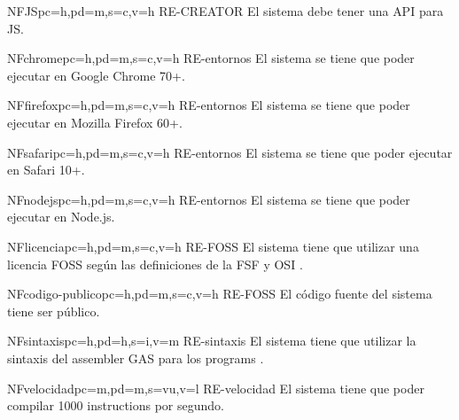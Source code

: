 \begin{softwareReq}{NF}{JS}{pc=h,pd=m,s=c,v=h}
    {RE-CREATOR}
    El sistema debe tener una \gls{API} para \gls{JS}.
\end{softwareReq}

\begin{softwareReq}{NF}{chrome}{pc=h,pd=m,s=c,v=h}
    {RE-entornos}
    El sistema se tiene que poder ejecutar en Google Chrome 70+.
\end{softwareReq}

\begin{softwareReq}{NF}{firefox}{pc=h,pd=m,s=c,v=h}
    {RE-entornos}
    El sistema se tiene que poder ejecutar en Mozilla Firefox 60+.
\end{softwareReq}

\begin{softwareReq}{NF}{safari}{pc=h,pd=m,s=c,v=h}
    {RE-entornos}
    El sistema se tiene que poder ejecutar en Safari 10+.
\end{softwareReq}

\begin{softwareReq}{NF}{nodejs}{pc=h,pd=m,s=c,v=h}
    {RE-entornos}
    El sistema se tiene que poder ejecutar en Node.js.
\end{softwareReq}

\begin{softwareReq}{NF}{licencia}{pc=h,pd=m,s=c,v=h}
    {RE-FOSS}
    El sistema tiene que utilizar una licencia \gls{FOSS} según las definiciones
    de la \gls{FSF} \parencite{FreeSoftware} y \gls{OSI} \parencite{OpenSource}.
\end{softwareReq}

\begin{softwareReq}{NF}{codigo-publico}{pc=h,pd=m,s=c,v=h}
    {RE-FOSS}
    El código fuente del sistema tiene ser público.
\end{softwareReq}

\begin{softwareReq}{NF}{sintaxis}{pc=h,pd=h,s=i,v=m}
    {RE-sintaxis}
    El sistema tiene que utilizar la sintaxis del \gls{assembler} GAS
    \parencite{as-manual} para los \glspl{program} .
\end{softwareReq}

\begin{softwareReq}{NF}{velocidad}{pc=m,pd=m,s=vu,v=l}
    {RE-velocidad}
    El sistema tiene que poder compilar 1000 \glspl{instruction} por segundo.
\end{softwareReq}

